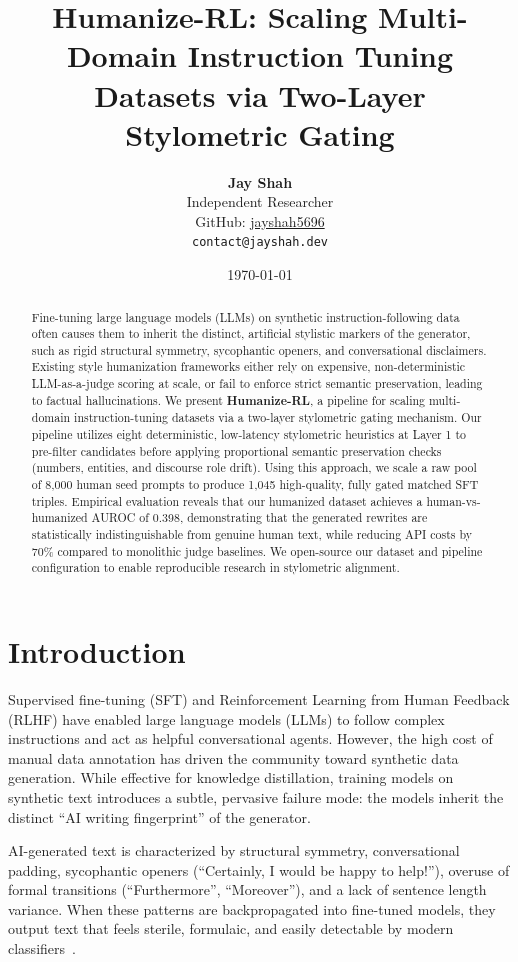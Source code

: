 \documentclass{article}
\title{\textbf{Humanize-RL: Scaling Multi-Domain Instruction Tuning Datasets via Two-Layer Stylometric Gating}}
\author{
  \textbf{Jay Shah} \\
  Independent Researcher \\
  GitHub: \href{https://github.com/jayshah5696}{jayshah5696} \\
  \texttt{contact@jayshah.dev}
}
\date{\today}
\begin{document}
\maketitle

\begin{abstract}
Fine-tuning large language models (LLMs) on synthetic instruction-following data often causes them to inherit the distinct, artificial stylistic markers of the generator, such as rigid structural symmetry, sycophantic openers, and conversational disclaimers. 
Existing style humanization frameworks either rely on expensive, non-deterministic LLM-as-a-judge scoring at scale, or fail to enforce strict semantic preservation, leading to factual hallucinations.
We present \textbf{Humanize-RL}, a pipeline for scaling multi-domain instruction-tuning datasets via a two-layer stylometric gating mechanism.
Our pipeline utilizes eight deterministic, low-latency stylometric heuristics at Layer 1 to pre-filter candidates before applying proportional semantic preservation checks (numbers, entities, and discourse role drift).
Using this approach, we scale a raw pool of 8,000 human seed prompts to produce 1,045 high-quality, fully gated matched SFT triples.
Empirical evaluation reveals that our humanized dataset achieves a human-vs-humanized AUROC of 0.398, demonstrating that the generated rewrites are statistically indistinguishable from genuine human text, while reducing API costs by 70\% compared to monolithic judge baselines.
We open-source our dataset and pipeline configuration to enable reproducible research in stylometric alignment.
\end{abstract}

\section{Introduction}
Supervised fine-tuning (SFT) and Reinforcement Learning from Human Feedback (RLHF) have enabled large language models (LLMs) to follow complex instructions and act as helpful conversational agents. However, the high cost of manual data annotation has driven the community toward synthetic data generation. While effective for knowledge distillation, training models on synthetic text introduces a subtle, pervasive failure mode: the models inherit the distinct ``AI writing fingerprint'' of the generator. 

AI-generated text is characterized by structural symmetry, conversational padding, sycophantic openers (``Certainly, I would be happy to help!''), overuse of formal transitions (``Furthermore'', ``Moreover''), and a lack of sentence length variance. When these patterns are backpropagated into fine-tuned models, they output text that feels sterile, formulaic, and easily detectable by modern classifiers~\citep{binoculars2024}.
\end{document}
